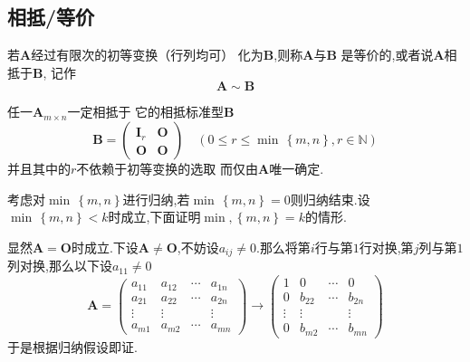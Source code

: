\subsection{相抵/等价}
\begin{formal}
\begin{definition}[相抵]\label{def:相抵}
    若$\bm{A}$经过有限次的初等变换（行列均可）
    化为$\bm{B}$,则称$\bm{A}$与$\bm{B}$
    是等价的,或者说$\bm{A}$相抵于$\bm{B}$,
    记作
    \[
    \bm{A} \sim \bm{B}
    \]
\end{definition}
\end{formal}
\begin{formal}
\begin{theorem}[相抵标准型]\label{thm:相抵标准型}
    任一$\bm{A}_{m \times n}$一定相抵于
    它的相抵标准型$\bm{B}$
    \[
    \bm{B} = 
    \begin{pmatrix}
        \bm{I}_r & \bm{O} \\
        \bm{O} & \bm{O} 
    \end{pmatrix}
    \quad 
    \left(0 \leqslant 
    r \leqslant \min \,\left\{
        m,n
    \right\},r \in \mathbb{N} \right)
    \]
    并且其中的$r$不依赖于初等变换的选取
    而仅由$\bm{A}$唯一确定.
\end{theorem}
\begin{Proof}
    考虑对$\min\,\left\{m,n\right\}$进行归纳,若$\min\,\left\{m,n\right\}=0$则归纳结束.设$\min\,\left\{m,n\right\}<k$时成立,下面证明$\min,\left\{m,n\right\}=k$的情形.

    显然$\bm{A}=\bm{O}$时成立.下设$\bm{A}\neq\bm{O} $,不妨设$a_{ij}\neq 0.$那么将第$i$行与第$1$行对换,第$j$列与第$1$列对换,那么以下设$a_{11}\neq 0$
    \[
    \bm{A}=\begin{pmatrix}
        a_{11}&a_{12}&\cdots&a_{1n}\\
        a_{21}&a_{22}&\cdots&a_{2n}\\
        \vdots&\vdots&&\vdots\\
        a_{m1}&a_{m2}&\cdots&a_{mn}
    \end{pmatrix}\longrightarrow
    \begin{pmatrix}
        1&0&\cdots&0\\
        0&b_{22}&\cdots&b_{2n}\\
        \vdots&\vdots&&\vdots\\
        0&b_{m2}&\cdots&b_{mn}
    \end{pmatrix}
    \]于是根据归纳假设即证.
\end{Proof}
\end{formal}
